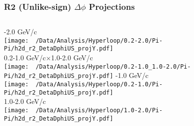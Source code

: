 \documentclass{beamer}
\begin{document}
\begin{frame}
	\frametitle{R2 (Unlike-sign) $\Delta\phi$ Projections}
	\begin{columns}
		-2.0 GeV/c\\
		\texttt{[image: ~/Data/Analysis/Hyperloop/0.2-2.0/Pi-Pi/h2d\_r2\_DetaDphiUS\_projY.pdf]}\\0.2-1.0 GeV/c$\times$1.0-2.0 GeV/c\\
		\texttt{[image: ~/Data/Analysis/Hyperloop/0.2-1.0\_1.0-2.0/Pi-Pi/h2d\_r2\_DetaDphiUS\_projY.pdf]}
		-1.0 GeV/c\\
		\texttt{[image: ~/Data/Analysis/Hyperloop/0.2-1.0/Pi-Pi/h2d\_r2\_DetaDphiUS\_projY.pdf]}\\1.0-2.0 GeV/c\\
		\texttt{[image: ~/Data/Analysis/Hyperloop/1.0-2.0/Pi-Pi/h2d\_r2\_DetaDphiUS\_projY.pdf]}
	\end{columns}
\end{frame}
\end{document}
